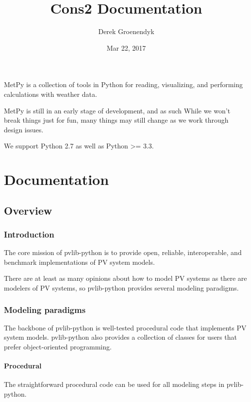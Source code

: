 \documentclass[letterpaper,10pt,english]{sphinxmanual}
\title{Cons2 Documentation}
\date{Mar 22, 2017}
\author{Derek Groenendyk}
\begin{document}
\maketitle
\sphinxtableofcontents
{}\label{\detokenize{index::doc}}


MetPy is a collection of tools in Python for reading, visualizing, and
performing calculations with weather data.

MetPy is still in an early stage of development, and as such
 While we won't break things
just for fun, many things may still change as we work through
design issues.

We support Python 2.7 as well as Python \textgreater{}= 3.3.


\chapter{Documentation}
\label{\detokenize{index:cons2}}\label{\detokenize{index:documentation}}

\section{Overview}
\label{\detokenize{overview:overview}}\label{\detokenize{overview::doc}}\label{\detokenize{overview:id1}}

\subsection{Introduction}
\label{\detokenize{overview:introduction}}
The core mission of pvlib-python is to provide open, reliable,
interoperable, and benchmark implementations of PV system models.

There are at least as many opinions about how to model PV systems as
there are modelers of PV systems, so
pvlib-python provides several modeling paradigms.


\subsection{Modeling paradigms}
\label{\detokenize{overview:id2}}\label{\detokenize{overview:modeling-paradigms}}
The backbone of pvlib-python
is well-tested procedural code that implements PV system models.
pvlib-python also provides a collection of classes for users
that prefer object-oriented programming.


\subsubsection{Procedural}
\label{\detokenize{overview:procedural}}
The straightforward procedural code can be used for all modeling
steps in pvlib-python.
\end{document}
